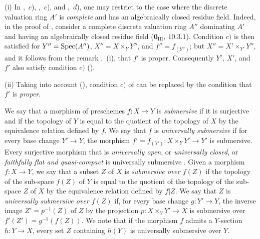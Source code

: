 \begin{remarks}[15.7.7]
\label{IV.15.7.7}
(i)
In ,~$c$), ,~$c$), and ,~$d$), one may restrict to the case where the discrete valuation ring $A'$ is \emph{complete} and has an algebraically closed residue field.
Indeed, in the proof of , consider a complete discrete valuation ring $A''$ dominating $A'$ and having an algebraically closed residue field ($\mathbf{0}_{\mathrm{III}},~10.3.1$). Condition $c)$ is then satisfied for $Y''=\operatorname{Spec}(A'')$, $X''=X\times_Y Y''$, and $f''=f_{(Y'')}$; but $X''=X'\times_{Y'}Y''$, and it follows from the remark ,~(i), that $f'$ is proper. Consequently $Y'$, $X'$, and $f'$ also satisfy condition $c)$ ().

(ii)
Taking into account (), condition $c)$ of  can be replaced by the condition that $f'$ is \emph{proper}.
\end{remarks}

\begin{env}[15.7.8]
\label{IV.15.7.8}
We say that a morphism of preschemes $f:X\to Y$ is \emph{submersive} if it is surjective and if the topology of $Y$ is equal to the quotient of the topology of $X$ by the equivalence relation defined by $f$.
We say that $f$ is \emph{universally submersive} if for every base change $Y'\to Y$, the morphism $f'=f_{(Y')}:X\times_Y Y'\to Y'$ is submersive.
Every surjective morphism that is \emph{universally open}, or \emph{universally closed}, or \emph{faithfully flat and quasi-compact} is universally submersive .
Given a morphism $f:X\to Y$, we say that a subset $Z$ of $X$ is \emph{submersive over $f(Z)$} if the topology of the sub-space $f(Z)$ of $Y$ is equal to the quotient of the topology of the sub-space $Z$ of $X$ by the equivalence relation defined by $f|Z$.
We say that $Z$ is \emph{universally submersive over $f(Z)$} if, for every base change $g:Y'\to Y$, the inverse image $Z'=p^{-1}(Z)$ of $Z$ by the projection $p:X\times_Y Y'\to X$ is submersive over $f'(Z')=g^{-1}(f(Z))$.
We note that if the morphism $f$ admits a $Y$-section $h:Y\to X$, every set $Z$ containing $h(Y)$ is universally submersive over $Y$.
\end{env}


